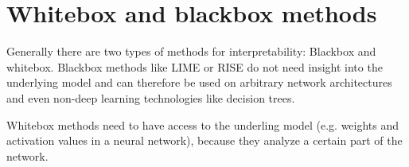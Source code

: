 \section{Whitebox and blackbox methods}
Generally there are two types of methods for interpretability: Blackbox and whitebox. Blackbox methods like LIME or RISE do not need insight into the underlying model and can therefore be used on arbitrary network architectures and even non-deep learning technologies like decision trees.

Whitebox methods need to have access to the underling model (e.g. weights and activation values in a neural network), because they analyze a certain part of the network.
